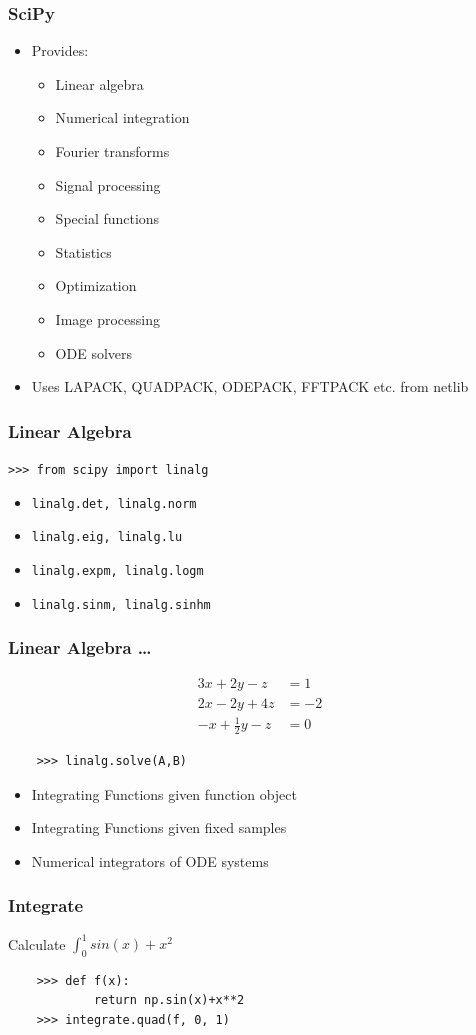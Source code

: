\documentclass[14pt,compress]{beamer}
\newcounter{time}
\newcommand{\inctime}[1]{\addtocounter{time}{#1}{\tiny \thetime\ m}}
\newcommand{\typ}[1]{\lstinline{#1}}
\begin{document}
\begin{frame}
  \frametitle{SciPy}
  \begin{itemize}
  \item Provides:
    \begin{itemize}
    \item Linear algebra
    \item Numerical integration
    \item Fourier transforms
    \item Signal processing
    \item Special functions
    \item Statistics
    \item Optimization
    \item Image processing
    \item ODE solvers
    \end{itemize}
  \item Uses LAPACK, QUADPACK, ODEPACK, FFTPACK etc. from netlib
  \end{itemize}
\end{frame}

\begin{frame}[fragile]
  \frametitle{Linear Algebra}
  \typ{>>> from scipy import linalg}
  \begin{itemize}
    \item \typ{linalg.det, linalg.norm}
    \item \typ{linalg.eig, linalg.lu}
    \item \typ{linalg.expm, linalg.logm}
    \item \typ{linalg.sinm, linalg.sinhm}
  \end{itemize}
\end{frame}

\begin{frame}[fragile]
  \frametitle{Linear Algebra \ldots}
  \begin{align*}
    3x + 2y - z  & = 1 \\
    2x - 2y + 4z  & = -2 \\
    -x + \frac{1}{2}y -z & = 0
  \end{align*}
  \begin{lstlisting}
    >>> linalg.solve(A,B)
  \end{lstlisting}
\inctime{15}
\end{frame}

\begin{frame}[fragile]
  \begin{itemize}
    \item Integrating Functions given function object
    \item Integrating Functions given fixed samples
    \item Numerical integrators of ODE systems
  \end{itemize}
  \frametitle{Integrate}
  Calculate $\int^1_0sin(x) + x^2$
  \begin{lstlisting}
    >>> def f(x):
            return np.sin(x)+x**2
    >>> integrate.quad(f, 0, 1)
  \end{lstlisting}
\end{frame}
\end{document}
